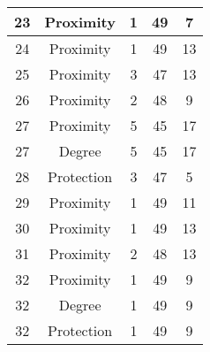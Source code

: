 \documentclass[results.tex]{subfiles}
\begin{document}
\begin{center}
\begin{tabular}{| c || c | c | c | c |}
            \hline
            23                      & Proximity                    & 1                      & 49                      & 7                    \\
            \hline
            24                      & Proximity                    & 1                      & 49                      & 13                   \\
            \hline
            25                      & Proximity                    & 3                      & 47                      & 13                   \\
            \hline
            26                      & Proximity                    & 2                      & 48                      & 9                    \\
            \hline
            27                      & Proximity                    & 5                      & 45                      & 17                   \\
            \hline
            27                      & Degree                       & 5                      & 45                      & 17                   \\
            \hline
            28                      & Protection                   & 3                      & 47                      & 5                    \\
            \hline
            29                      & Proximity                    & 1                      & 49                      & 11                   \\
            \hline
            30                      & Proximity                    & 1                      & 49                      & 13                   \\
            \hline
            31                      & Proximity                    & 2                      & 48                      & 13                   \\
            \hline
            32                      & Proximity                    & 1                      & 49                      & 9                    \\
            \hline
            32                      & Degree                       & 1                      & 49                      & 9                    \\
            \hline
            32                      & Protection                   & 1                      & 49                      & 9                    \\

\end{tabular}
\end{center}
\end{document}
